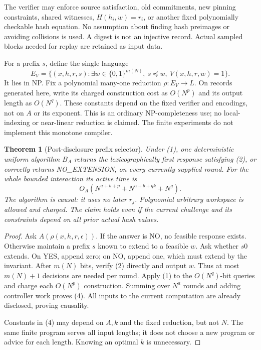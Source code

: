 \documentclass[11pt]{article}
\newtheorem{theorem}{Theorem}
\begin{document}
The verifier may enforce source satisfaction, old commitments, new pinning
constraints, shared witnesses, $H(h_i,w)=r_i$, or another fixed
polynomially checkable hash equation. No assumption about finding hash
preimages or avoiding collisions is used. A digest is not an injective record.
Actual sampled blocks needed for replay are retained as input data.

For a prefix $s$, define the single language
\[
 E_V=\{(x,h,r,s):\exists w\in\{0,1\}^{m(N)},\ s\preceq w,
                         \ V(x,h,r,w)=1\}.             \tag{3}
\]
It lies in NP. Fix a polynomial many-one reduction $\rho:E_V\to L$.
On records generated here, write its charged construction cost as $O(N^p)$
and its output length as $O(N^q)$. These constants depend on the fixed
verifier and encodings, not on $A$ or its exponent. This is an ordinary
NP-completeness use; no local-indexing or near-linear reduction is claimed.
The finite experiments do not implement this monotone compiler.

\begin{theorem}[Post-disclosure prefix selector]\label{thm:prefix}
Under (1), one deterministic uniform algorithm $B_A$ returns the
lexicographically first response satisfying (2), or correctly returns
\textnormal{NO\_EXTENSION}, on every currently supplied round. For the whole
bounded interaction its active time is
\[
 O_A\!\left(N^{a+b+p}+N^{a+b+qk}+N^g\right).             \tag{4}
\]
The algorithm is causal: it uses no later $r_j$. Polynomial arbitrary
workspace is allowed and charged. The claim holds even if the current
challenge and its constraints depend on all prior actual hash values.
\end{theorem}
\begin{proof}
Ask $A(\rho(x,h,r,\epsilon))$. If the answer is NO, no feasible response
exists. Otherwise maintain a prefix $s$ known to extend to a feasible $w$.
Ask whether $s0$ extends. On YES, append zero; on NO, append one, which must
extend by the invariant. After $m(N)$ bits, verify (2) directly and output
$w$. Thus at most $m(N)+1$ decisions are needed per round. Apply (1) to the
$O(N^q)$-bit queries and charge each $O(N^p)$ construction. Summing over
$N^a$ rounds and adding controller work proves (4). All inputs to the
current computation are already disclosed, proving causality.

Constants in (4) may depend on $A,k$ and the fixed reduction, but not $N$.
The same finite program serves all input lengths; it does not choose a
new program or advice for each length. Knowing an optimal $k$ is unnecessary.
\end{proof}
\end{document}

